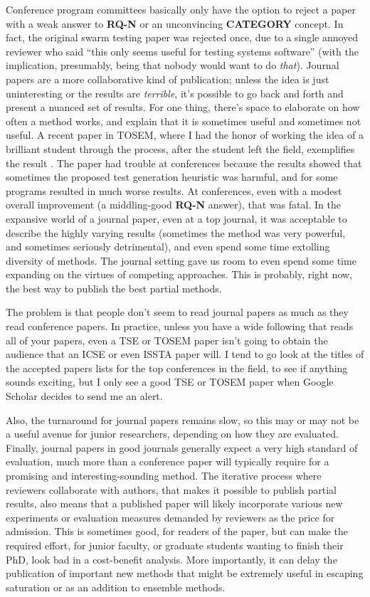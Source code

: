 \documentclass[sigplan,screen]{acmart}
\begin{document}
Conference program committees basically only have the option to reject
a paper with a weak answer to {\bf RQ-N} or an unconvincing {\bf
  CATEGORY} concept.  In fact, the original swarm testing paper was
rejected once, due to a single annoyed reviewer who said ``this only seems useful for
testing systems software'' (with the implication, presumably, being
that nobody would want to do \emph{that}).  Journal papers are a more
collaborative kind of publication; unless the idea is just
uninteresting or the results are \emph{terrible}, it's possible to go
back and forth and present a nuanced set of results.  For one thing,
there's space to elaborate on how often a method works, and explain
that it is sometimes useful and sometimes not useful.  A recent paper
in TOSEM, where I had the honor of working the idea of a brilliant
student through the process, after the student left the field,
exemplifies the result \cite{HolmesLOC}.  The paper had trouble at
conferences because the results showed that sometimes the proposed
test generation heuristic was harmful, and for some programs resulted
in much worse results.  At conferences, even with a modest overall
improvement (a middling-good {\bf RQ-N} answer), that was fatal.  In
the expansive world of a journal paper, even at a top journal, it was
acceptable to describe the highly varying results (sometimes the
method was very powerful, and sometimes seriously detrimental), and
even spend some time extolling diversity of methods.  The journal
setting gave us room to even spend some time expanding on the virtues
of competing approaches.  This is probably, right now, the best way to
publish the best partial methods.

The problem is that people don't seem to read journal papers as much
as they read conference papers.  In practice, unless you have a wide
following that reads all of your papers, even a TSE or TOSEM paper
isn't going to obtain the audience that an ICSE or even ISSTA paper
will.  I tend to go look at the titles of the accepted papers lists for the
top conferences in the field, to see if anything sounds exciting, but I only see a good TSE or TOSEM
paper when Google Scholar decides to send me an alert.

Also, the turnaround for journal papers remains slow, so this
may or may not be a useful avenue for junior researchers, depending on
how they are evaluated.  Finally, journal papers in good journals generally expect a
very high standard of evaluation, much more than a conference paper
will typically require for a promising and interesting-sounding
method.  The iterative process where reviewers collaborate with
authors, that makes it possible to publish partial results, also means
that a published paper will likely incorporate various new experiments
or evaluation measures demanded by reviewers as the price for
admission.  This is sometimes good, for readers of the paper, but can make the required effort,
for junior faculty, or graduate students wanting to finish their PhD,
look bad in a cost-benefit analysis.  More importantly, it can delay
the publication of important new methods that might be extremely
useful in escaping saturation or as an addition to ensemble methods.
\end{document}
